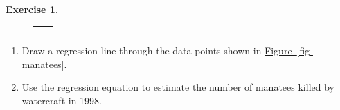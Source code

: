 \documentclass[10pt,]{book}
\theoremstyle{plain}
\theoremstyle{definition}
\theoremstyle{definition}
\theoremstyle{definition}
\theoremstyle{definition}
\newtheorem{exercise}[theorem]{Exercise}
\numberwithin{equation}{part}
\newlength{\panelmax}
\begin{document}
\begin{exercise}
{\begin{figure}
\begin{tabular}{@{}*{2}{c}@{}}
\begin{minipage}[c][\panelmax][t]{0.5\textwidth}\usebox{\panelboxIAimage}\end{minipage}\tabularnewline
&
\parbox[t]{0.5\textwidth}{
}\end{tabular}
\end{figure}
}%
 \leavevmode%
\begin{enumerate}[label=*\alph**]
\item\hypertarget{li-1315}{}Draw a regression line through the data points shown in \hyperref[fig-manatees]{Figure~\ref{fig-manatees}}.%
\item\hypertarget{li-1316}{}Use the regression equation to estimate the number of manatees killed by watercraft in 1998.%
\end{enumerate}
%
\end{exercise}
\typeout{************************************************}
\typeout{************************************************}
\end{document}
